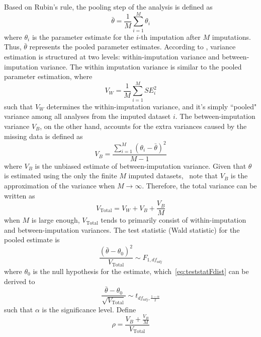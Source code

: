 Based on Rubin's rule, the pooling step of the analysis is defined as
\begin{equation} 
    \bar{\theta}=\frac{1}{M}\sum_{i=1}^M\theta_i
\end{equation}
where $\theta_i$ is the parameter estimate for the $i$-th imputation after $M$ imputations. 
Thus, $\bar{\theta}$ represents the pooled parameter estimates.
According to \citet{barnard1999miscellanea}, variance estimation is structured at two levels: within-imputation variance and between-imputation variance.
The within imputation variance is similar to the pooled parameter estimation, where 
\begin{equation} 
    V_W=\frac{1}{M}\sum_{i=1}^MSE_i^2
\end{equation}
such that $V_W$ determines the within-imputation variance, and it's simply ``pooled" variance among all analyses from the imputed dataset $i$. 
The between-imputation variance $V_B$, on the other hand, accounts for the extra variances caused by the missing data is defined as 
\begin{equation} 
    V_B=\frac{\sum_{i=1}^M(\theta_i-\bar{\theta})^2}{M-1}
\end{equation}
where $V_B$ is the unbiased estimate of between-imputation variance. 
Given that $\theta$ is estimated using the only the finite $M$ imputed datasets,~\citet{van2018flexible} note that $V_B$ is the approximation of the variance when $M\rightarrow\infty$.
Therefore, the total variance can be written as
\begin{equation} 
    V_{\text{Total}}=V_W+V_B+\frac{V_B}{M}
\end{equation}
when $M$ is large enough, $V_{\text{Total}}$ tends to primarily consist of within-imputation and between-imputation variances.
The test statistic (Wald statistic) for the pooled estimate is 
\begin{equation}\label{eq:teststatFdist}
    \frac{(\bar{\theta}-\theta_0)^2}{V_{\text{Total}}}\sim F_{1,df_{adj}}
\end{equation}
where $\theta_0$ is the null hypothesis for the estimate, which~\ref{eq:teststatFdist} can be derived to
\begin{equation} 
    \frac{\bar{\theta}-\theta_0}{\sqrt{V_{\text{Total}}}}\sim t_{df_{adj}, \frac{1-\alpha}{2}}
\end{equation}
such that $\alpha$ is the significance level. 
Define 
\begin{equation}
    \rho=\frac{V_B+\frac{V_B}{M}}{V_{\text{Total}}}
\end{equation}
